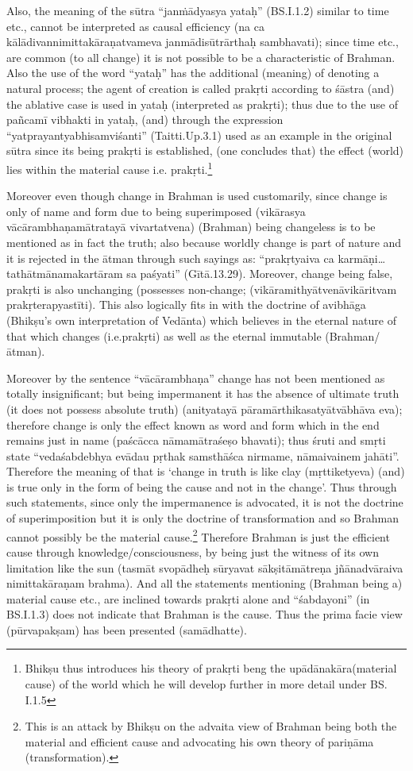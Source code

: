 Also, the meaning of the sūtra “janṁādyasya yataḥ” (BS.I.1.2) similar to time etc., cannot be interpreted as causal efficiency (na ca kālādivannimittakāraṇatvameva janmādisūtrārthaḥ sambhavati); since time etc., are common (to all change) it is not possible to be a characteristic of Brahman. Also the use of the word “yataḥ” has the additional (meaning) of denoting a natural process; the agent of creation is called prakṛti according to śāstra (and) the ablative case is used in yataḥ (interpreted as prakṛti); thus due to the use of pañcamī vibhakti in yataḥ, (and) through the expression “yatprayantyabhisamviśanti” (Taitti.Up.3.1) used as an example in the original sūtra since its being prakṛti is established, (one concludes that) the effect (world) lies within the material cause i.e. prakṛti.\footnote{Bhikṣu thus introduces his theory of prakṛti beng the upādānakāra(material cause) of the world which he will develop further in more detail under BS. I.1.5} 

Moreover even though change in Brahman is used customarily, since change is only of name and form due to being superimposed (vikārasya vācārambhaṇamātratayā vivartatvena) (Brahman) being changeless is to be mentioned as in fact the truth; also because worldly change is part of nature and it is rejected in the ātman through such sayings as: “prakṛtyaiva ca karmāṇi…tathātmānamakartāram sa paśyati” (Gītā.13.29). Moreover, change being false, prakṛti is also unchanging (possesses non-change; (vikāramithyātvenāvikāritvam prakṛterapyastīti). This also logically fits in with the doctrine of avibhāga (Bhikṣu’s own interpretation of Vedānta) which believes in the eternal nature of that which changes (i.e.prakṛti) as well as the eternal immutable (Brahman/ātman).

Moreover by the sentence “vācārambhaṇa” change has not been mentioned as totally insignificant; but being impermanent it has the absence of ultimate truth (it does not possess absolute truth) (anityatayā pāramārthikasatyātvābhāva eva); therefore change is only the effect known as word and form which in the end remains just in name (paścācca nāmamātraśeṣo bhavati); thus śruti and smṛti state “vedaśabdebhya evādau pṛthak samsthāśca nirmame, nāmaivainem jahāti”. Therefore the meaning of that is ‘change in truth is like clay (mṛttiketyeva) (and) is true only in the form of being the cause and not in the change’. Thus through such statements, since only the impermanence is advocated, it is not the doctrine of superimposition but it is only the doctrine of transformation and so Brahman cannot possibly be the material cause.\footnote{This is an attack by Bhikṣu on the advaita view of Brahman being both the material and efficient cause and advocating his own theory of pariṇāma (transformation).} Therefore Brahman is just the efficient cause through knowledge/consciousness, by being just the witness of its own limitation like the sun (tasmāt svopādheḥ sūryavat sākṣitāmātreṇa jñānadvāraiva nimittakāraṇam brahma). And all the statements mentioning (Brahman being a) material cause etc., are inclined towards prakṛti alone and “śabdayoni” (in BS.I.1.3) does not indicate that Brahman is the cause. Thus the prima facie view (pūrvapakṣam) has been presented (samādhatte).


